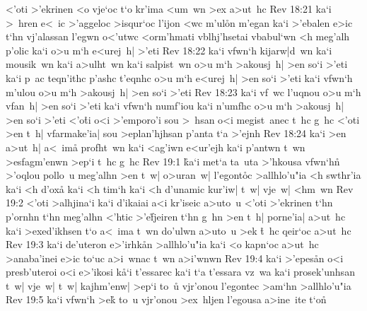 <'oti
>'ekrinen
<o
vje`oc
t`o
kr'ima
<um~wn
>ex
a>ut~hc\bibvsend
\vs Rev 18:21
ka`i
>~hren
e<~ic
>'aggeloc
>isqur`oc
l'ijon
<wc
m'ul\r{o}n
m'egan
ka`i
>'ebalen
e>ic
t`hn
vj'alassan
l'egwn
o<'utwc
<orm'hmati
vblhj'hsetai
vbabul`wn
<h
meg'alh
p'olic
ka`i
o>u
m`h
e<urej~h|
>'eti\bibvsend
\vs Rev 18:22
ka`i
vfwn`h
kijarw|d~wn
ka`i
mousik~wn
ka`i
a>ulht~wn
ka`i
salpist~wn
o>u
m`h
>akousj~h|
>en
so`i
>'eti
ka`i
p~ac
teqn'ithc
p'ashc
t'eqnhc
o>u
m`h
e<urej~h|
>en
so`i
>'eti
ka`i
vfwn`h
m'ulou
o>u
m`h
>akousj~h|
>en
so`i
>'eti\bibvsend
\vs Rev 18:23
ka`i
vf~wc
l'uqnou
o>u
m`h
vfan~h|
>en
so`i
>'eti
ka`i
vfwn`h
numf'iou
ka`i
n'umfhc
o>u
m`h
>akousj~h|
>en
so`i
>'eti
<'o\r{t}i
o<i
>'emporo'i
sou
>~hsan
o<i
megist~anec
t~hc
g~hc
<'oti
>en
t~h|
vfarmake'ia|
sou
>eplan'hjhsan
p'anta
t`a
>'ejnh\bibvsend
\vs Rev 18:24
ka`i
>en
a>ut~h|
a<~im\r{a}
profht~wn
ka`i
<ag'iwn
e<ur'ejh
ka`i
p'antwn
t~wn
>esfagm'enwn
>ep`i
t~hc
g~hc\bibvsend
\vs Rev 19:1
\r{k}a`i
met`a
ta~uta
>'hkousa
vfwn`hn\r{}
>'oqlou
pollo~u
meg'alhn
>en
t~w|
o>uran~w|
l'egont\r{o}c
>allhlo'u"ia
<h
swthr'ia
ka`i
<h
d'oxa\r{}
ka`i
<h
tim`h
ka`i
<h
d'unamic
kur'iw|
t~w|
vje~w|
<hm~wn\bibvsend
\vs Rev 19:2
<'oti
>alhjina`i
ka`i
d'ikaiai
a<i
kr'iseic
a>uto~u
<'oti
>'ekrinen
t`hn
p'ornhn
t`hn
meg'alhn
<'htic
>'e\r{f}jeiren
t`hn
g~hn
>en
t~h|
porne'ia|
a>ut~hc
ka`i
>exed'ikhsen
t`o
a<~ima
t~wn
do'ulwn
a>uto~u
>ek
\r{t}~hc
qeir`oc
a>ut~hc\bibvsend
\vs Rev 19:3
ka`i
de'uteron
e>'irhk\r{a}n
>allhlo'u"ia
ka`i
<o
kapn`oc
a>ut~hc
>anaba'inei
e>ic
to`uc
a>i~wnac
t~wn
a>i'wnwn\bibvsend
\vs Rev 19:4
ka`i
>'epes\r{a}n
o<i
presb'uteroi
o<i
e>'ikosi
k\r{a}`i
t'essarec
ka`i
t`a
t'essara
vz~wa
ka`i
prosek'unhsan
t~w|
vje~w|
t~w|
kajhm'enw|
>ep`i
to~u\r{}
vjr'onou
l'egontec
>am`hn
>allhlo'u"ia\bibvsend
\vs Rev 19:5
ka`i
vfwn`h
>e\r{k}
to~u
vjr'onou
>ex~hljen
l'egousa
a>ine~ite
t`on\r{}
